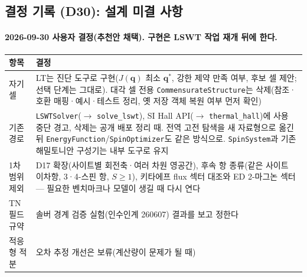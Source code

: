 \subsection{결정 기록 (D30): 설계 미결 사항}\label{decisions-d30}
\begingroup%
  \framesubtitle{2026-09-30 사용자 결정(추천안 채택). 구현은 LSWT 작업 재개 뒤에 한다.}
  \footnotesize\renewcommand{\arraystretch}{1.1}
  \begin{tabularx}{\textwidth}{@{}p{2.4cm}Y@{}}
    \toprule
    항목 & 결정 \\
    \midrule
    자기 셀 & LT는 진단 도구로 구현($J(\mathbf q)$ 최소 $\mathbf q^*$, 강한 제약 만족 여부, 후보 셀 제안; 선택 단계는 그대로). 대각 셀 전용 \texttt{CommensurateStructure}는 삭제(참조·호환 매핑·예시·테스트 정리, 옛 저장 객체 복원 여부 먼저 확인) \\
    기존 경로 & \texttt{LSWTSolver}($\to$ \texttt{solve\_lswt}), SI Hall API($\to$ \texttt{thermal\_hall})에 사용 중단 경고, 삭제는 공개 배포 정리 때. 전역 고전 탐색을 새 자료형으로 옮긴 뒤 \texttt{EnergyFunction}/\texttt{SpinOptimizer}도 같은 방식으로. \texttt{SpinSystem}과 기존 해밀토니안 구성기는 내부 도구로 유지 \\
    1차 범위 제외 & D17 확장(사이트별 회전축·여러 차원 영공간), 후속 항 종류(같은 사이트 이차항, 3·4-스핀 항, $S\ge1$), 키타에프 flux 섹터 대조와 ED 2-마그논 섹터 --- 필요한 벤치마크나 모델이 생길 때 다시 연다 \\
    TN 필드 규약 & 솔버 경계 검증 실험(인수인계 260607) 결과를 보고 정한다 \\
    적응형 적분 & 오차 추정 개선은 보류(계산량이 문제가 될 때) \\
    \bottomrule
  \end{tabularx}
\endgroup


